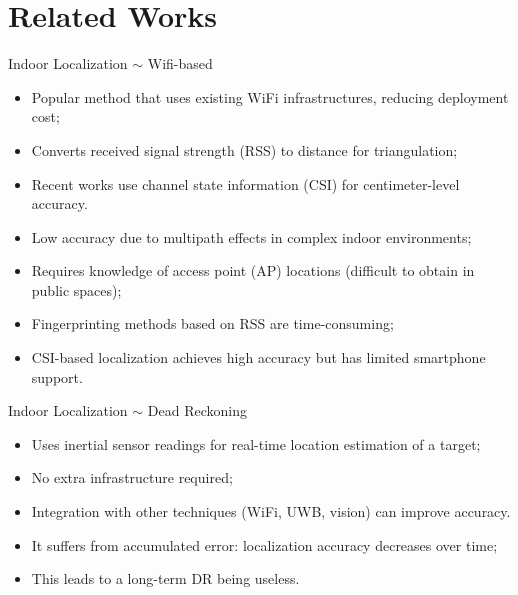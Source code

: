 \section{Related Works}
\begin{frame}{Indoor Localization $\sim$ Wifi-based}
	\begin{itemize}
		\item Popular method that uses existing WiFi infrastructures, reducing deployment cost;
		\item Converts received signal strength (RSS) to distance for triangulation;
		\item Recent works use channel state information (CSI) for centimeter-level accuracy.
	\end{itemize}
	\pause
	\begin{itemize}
		\item Low accuracy due to multipath effects in complex indoor environments;
		\item Requires knowledge of access point (AP) locations (difficult to obtain in public spaces);
		\item Fingerprinting methods based on RSS are time-consuming;
		\item CSI-based localization achieves high accuracy but has limited smartphone support.
	\end{itemize}
\end{frame}

\begin{frame}{Indoor Localization $\sim$ Dead Reckoning}
	\begin{itemize}
		\item Uses inertial sensor readings for real-time location estimation of a target;
		\item No extra infrastructure required;
		\item Integration with other techniques (WiFi, UWB, vision) can improve accuracy.
	\end{itemize}
	\pause
	\begin{itemize}
		\item It suffers from accumulated error: localization accuracy decreases over time;
		\item This leads to a long-term DR being useless.
	\end{itemize}
\end{frame}


